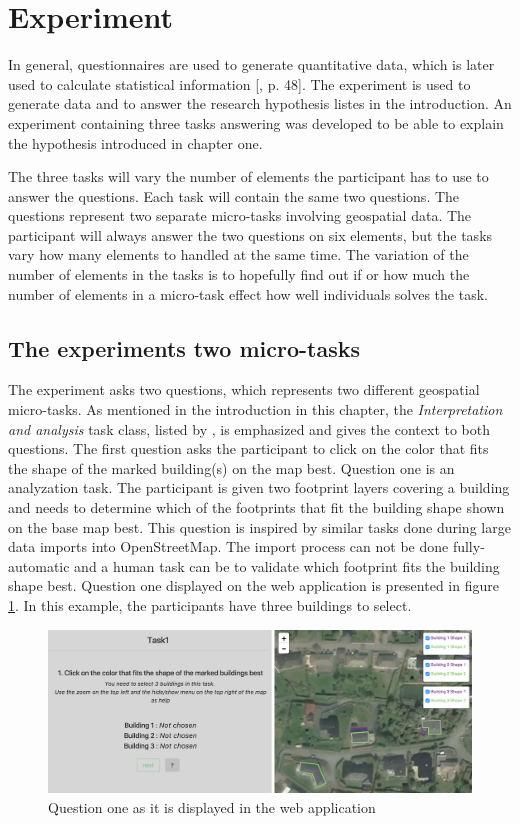 \section{Experiment}\label{sec:experiment}
In general, questionnaires are used to generate quantitative data, which is later used to calculate statistical information [\citep{Kitchin2000}, p. 48]. The experiment is used to generate data and to answer the research hypothesis listes in the introduction. An experiment containing three tasks answering was developed to be able to explain the hypothesis introduced in chapter one. 

The three tasks will vary the number of elements the participant has to use to answer the questions. Each task will contain the same two questions. The questions represent two separate micro-tasks involving geospatial data. The participant will always answer the two questions on six elements, but the tasks vary how many elements to handled at the same time. The variation of the number of elements in the tasks is to hopefully find out if or how much the number of elements in a micro-task effect how well individuals solves the task. 

\subsection{The experiments two micro-tasks}\label{sec:experimentquestions}
The experiment asks two questions, which represents two different geospatial micro-tasks. As mentioned in the introduction in this chapter, the \textit{Interpretation and analysis} task class, listed by \cite{Gadiraju2015}, is emphasized and gives the context to both questions.  The first question asks the participant to click on the color that fits the shape of the marked building(s) on the map best. Question one is an analyzation task. The participant is given two footprint layers covering a building and needs to determine which of the footprints that fit the building shape shown on the base map best. This question is inspired by similar tasks done during large data imports into OpenStreetMap. The import process can not be done fully-automatic and a human task can be to validate which footprint fits the building shape best. Question one displayed on the web application is presented in figure \ref{fig:q12}. In this example, the participants have three buildings to select. 

\begin{figure}[h]
	\centering
	\includegraphics[width=0.8\linewidth]{fig/q1_2}
	\caption{Question one as it is displayed in the web application}
	\label{fig:q12}
\end{figure}

